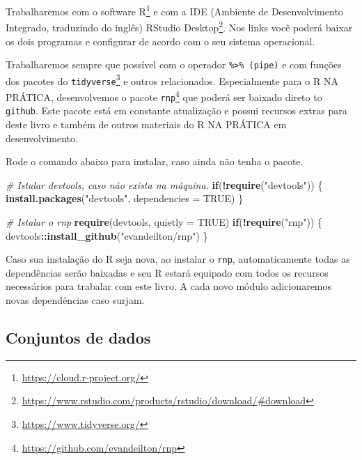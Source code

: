 \documentclass[11pt,]{style/krantz}
\makeatletter
\newenvironment{Shaded}{\begin{snugshade}}{\end{snugshade}}
\newcommand{\CommentTok}[1]{\textcolor[rgb]{0.56,0.35,0.01}{\textit{#1}}}
\newcommand{\ControlFlowTok}[1]{\textcolor[rgb]{0.13,0.29,0.53}{\textbf{#1}}}
\newcommand{\DataTypeTok}[1]{\textcolor[rgb]{0.13,0.29,0.53}{#1}}
\newcommand{\KeywordTok}[1]{\textcolor[rgb]{0.13,0.29,0.53}{\textbf{#1}}}
\newcommand{\NormalTok}[1]{#1}
\newcommand{\OperatorTok}[1]{\textcolor[rgb]{0.81,0.36,0.00}{\textbf{#1}}}
\newcommand{\OtherTok}[1]{\textcolor[rgb]{0.56,0.35,0.01}{#1}}
\newcommand{\StringTok}[1]{\textcolor[rgb]{0.31,0.60,0.02}{#1}}
\renewenvironment{quote}{\begin{VF}}{\end{VF}}
\renewcommand{\href}[2]{#2\footnote{\url{#1}}}
\newenvironment{kframe}{%
\medskip{}
\setlength{\fboxsep}{.8em}
 \def\at@end@of@kframe{}%
 \ifinner\ifhmode%
  \def\at@end@of@kframe{\end{minipage}}%
  \begin{minipage}{\columnwidth}%
 \fi\fi%
 \def\FrameCommand##1{\hskip\@totalleftmargin \hskip-\fboxsep
 \colorbox{shadecolor}{##1}\hskip-\fboxsep
     \hskip-\linewidth \hskip-\@totalleftmargin \hskip\columnwidth}%
 \MakeFramed {\advance\hsize-\width
   \@totalleftmargin\z@ \linewidth\hsize
   \@setminipage}}%
 {\par\unskip\endMakeFramed%
 \at@end@of@kframe}
\renewenvironment{Shaded}{\begin{kframe}}{\end{kframe}}
\theoremstyle{definition}
\theoremstyle{definition}
\theoremstyle{definition}
\theoremstyle{remark}
\makeatother
\begin{document}
Trabalharemos com o \href{https://cloud.r-project.org/}{software R} e com a IDE (Ambiente de Desenvolvimento Integrado, traduzindo do inglês) \href{https://www.rstudio.com/products/rstudio/download/\#download}{RStudio Desktop}. Nos links você poderá baixar os dois programas e configurar de acordo com o seu sistema operacional.

Trabalharemos sempre que possível com o operador \texttt{\%\textgreater{}\%\ (pipe)} e com funções dos pacotes do \href{https://www.tidyverse.org/}{\texttt{tidyverse}} e outros relacionados. Especialmente para o R NA PRÁTICA, desenvolvemos o pacote \href{https://github.com/evandeilton/rnp}{\texttt{rnp}} que poderá ser baixado direto to \texttt{github}. Este pacote está em constante atualização e possui recursos extras para deste livro e também de outros materiais do R NA PRÁTICA em desenvolvimento.

Rode o comando abaixo para instalar, caso ainda não tenha o pacote.

\begin{Shaded}
\begin{Highlighting}[]
\CommentTok{# Istalar devtools, caso não exista na máquina.}
\ControlFlowTok{if}\NormalTok{(}\OperatorTok{!}\KeywordTok{require}\NormalTok{(}\StringTok{"devtools"}\NormalTok{)) \{}
 \KeywordTok{install.packages}\NormalTok{(}\StringTok{"devtools"}\NormalTok{, }\DataTypeTok{dependencies =} \OtherTok{TRUE}\NormalTok{)}
\NormalTok{\}}

\CommentTok{# Istalar o rnp}
\KeywordTok{require}\NormalTok{(devtools, }\DataTypeTok{quietly =} \OtherTok{TRUE}\NormalTok{)}
\ControlFlowTok{if}\NormalTok{(}\OperatorTok{!}\KeywordTok{require}\NormalTok{(}\StringTok{"rnp"}\NormalTok{)) \{}
\NormalTok{ devtools}\OperatorTok{::}\KeywordTok{install_github}\NormalTok{(}\StringTok{"evandeilton/rnp"}\NormalTok{) }
\NormalTok{\}}
\end{Highlighting}
\end{Shaded}

\begin{quote}
Caso sua instalação do R seja nova, ao instalar o \texttt{rnp}, automaticamente todas as dependências serão baixadas e seu R estará equipado com todos os recursos necessários para trabalar com este livro. A cada novo módulo adicionaremos novas dependências caso surjam.
\end{quote}

\hypertarget{conjuntos-de-dados}{%
\subsection*{Conjuntos de dados}\label{conjuntos-de-dados}}
\end{document}
